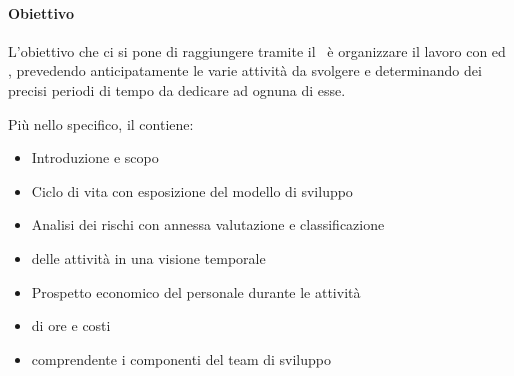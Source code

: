			\paragraph{Obiettivo}
			L'obiettivo che ci si pone di raggiungere tramite il \PdP\ è organizzare il lavoro con  ed , prevedendo anticipatamente le varie attività da svolgere e determinando dei precisi periodi di tempo da dedicare ad ognuna di esse. \par
			Più nello specifico, il \Doc{\PdPv} contiene:
			\begin{itemize}
				\item Introduzione e scopo
				\item Ciclo di vita con esposizione del modello di sviluppo
				\item Analisi dei rischi con annessa valutazione e classificazione
				\item {} delle attività in una visione temporale
				\item Prospetto economico del personale durante le attività
				\item {} di ore e costi
				\item {} comprendente i componenti del team di sviluppo
			\end{itemize}

